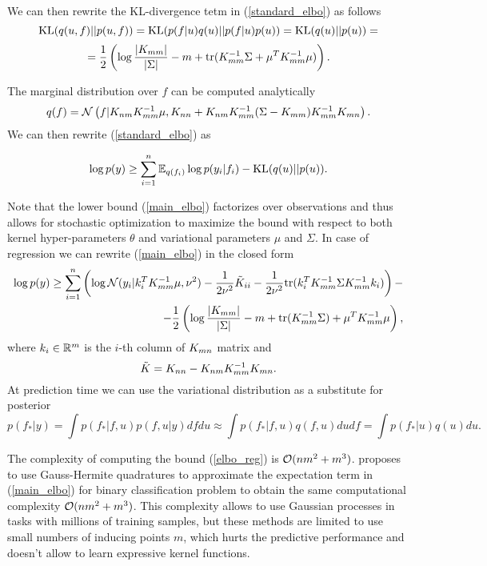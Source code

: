   We can then rewrite the KL-divergence tetm in (\ref{standard_elbo}) as follows
  \[
    \mbox{KL}(q(u, f) || p(u, f)) = \mbox{KL}(p(f | u) q(u) || p(f | u) p(u)) = \mbox{KL}(q(u) || p(u)) =
  \]
  \[
    = \frac 1 2 \left(\log \frac{|K_{mm}|}{|\Sigma|} - m + \mbox{tr}(K_{mm}^{-1} \Sigma + \mu^T K_{mm}^{-1} \mu) \right).
  \]

  The marginal distribution over $f$ can be computed analytically
  \[
    q(f) = \mathcal{N}\left(f | K_{nm} K_{mm}^{-1} \mu, K_{nn} + K_{nm} K_{mm}^{-1} (\Sigma - K_{mm}) K_{mm}^{-1} K_{mn}\right).
  \]
  We can then rewrite (\ref{standard_elbo}) as

  \begin{equation}
  \label{main_elbo}
    \log p(y) \ge \sum_{i=1}^n \mathbb{E}_{q(f_i)} \log p(y_i | f_i) - \mbox{KL}(q(u) || p(u)).
  \end{equation}

  Note that the lower bound (\ref{main_elbo}) factorizes over observations and
  thus allows for stochastic optimization to maximize the bound with respect
  to both kernel hyper-parameters $\theta$ and variational parameters $\mu$ and
  $\Sigma$. In case of regression we can rewrite (\ref{main_elbo}) in the closed
  form
  \begin{equation}
    \label{elbo_reg}
    \begin{split}
      \log p(y) \ge
      \sum_{i=1}^n \left ( \log \mathcal{N} (y_i | k_{i}^T K_{mm}^{-1} \mu, \nu^2) -
        \frac 1 {2\nu^2} \tilde K_{ii} -
        \frac 1 {2\nu^2} \mbox{tr} (k_{i}^T K_{mm}^{-1} \Sigma K_{mm}^{-1} k_{i})
      \right )-
      \\
      - \frac 1 2 \left(
        \log \frac {|K_{mm}|} {|\Sigma|} - m + \mbox{tr}(K_{mm}^{-1} \Sigma) +
        \mu^T K_{mm}^{-1} \mu
      \right),
    \end{split}
  \end{equation}
  where $k_{i} \in \mathbb{R}^m$ is the $i$-th column of $K_{mn}$ matrix and
  \[
    \tilde{K} = K_{nn} - K_{nm} K_{mm}^{-1} K_{mn}.
  \]
  At prediction time we can use the variational distribution as a substitute for
  posterior
  \[
    p(f_* | y) = \int p(f_*| f, u) p(f, u |y) d f d u \approx
    \int p(f_* | f, u) q(f, u) d u d f = \int p(f_* | u) q(u) du.
  \]

  The complexity of computing the bound (\ref{elbo_reg}) is $\mathcal{O}(n m^2 + m^3)$.
  \citet{hensman2015} proposes to use Gauss-Hermite quadratures to approximate the
  expectation term in (\ref{main_elbo}) for binary classification problem to
  obtain the same computational complexity $\mathcal{O}(nm^2 + m^3)$. This complexity
  allows to use Gaussian processes in tasks with millions of training samples,
  but these methods are limited to use small numbers of inducing points $m$,
  which hurts the predictive performance and doesn't allow to learn expressive
  kernel functions.

